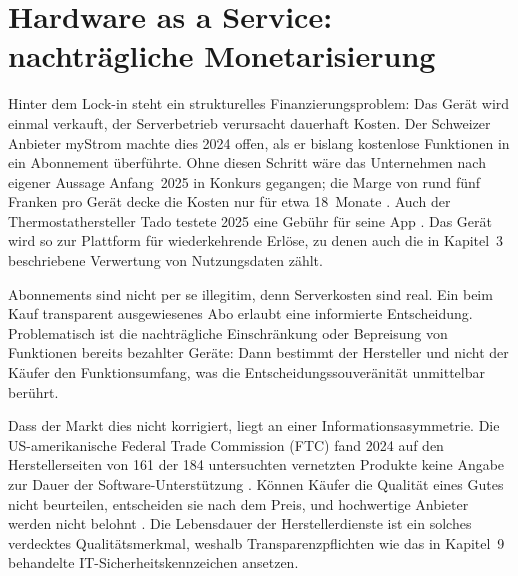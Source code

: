 \section{Hardware as a Service: nachträgliche Monetarisierung}\label{sec:cloud-haas}

Hinter dem Lock-in steht ein strukturelles Finanzierungsproblem: Das Gerät
wird einmal verkauft, der Serverbetrieb verursacht dauerhaft Kosten. Der
Schweizer Anbieter myStrom machte dies 2024 offen, als er bislang kostenlose
Funktionen in ein Abonnement überführte. Ohne diesen Schritt wäre das
Unternehmen nach eigener Aussage Anfang~2025 in Konkurs gegangen; die Marge
von rund fünf Franken pro Gerät decke die Kosten nur für etwa 18~Monate
\autocite[vgl.][]{itreseller:2024}. Auch der Thermostathersteller Tado
testete 2025 eine Gebühr für seine App \autocite[vgl.][]{heise:2025b}. Das
Gerät wird so zur Plattform für wiederkehrende Erlöse, zu denen auch die in
Kapitel~3 beschriebene Verwertung von Nutzungsdaten zählt.

Abonnements sind nicht per se illegitim, denn Serverkosten sind real. Ein
beim Kauf transparent ausgewiesenes Abo erlaubt eine informierte
Entscheidung. Problematisch ist die nachträgliche Einschränkung oder
Bepreisung von Funktionen bereits bezahlter Geräte: Dann bestimmt der
Hersteller und nicht der Käufer den Funktionsumfang, was die
Entscheidungssouveränität unmittelbar berührt.

Dass der Markt dies nicht korrigiert, liegt an einer Informationsasymmetrie.
Die US-amerikanische Federal Trade Commission (\acrshort{FTC}) fand 2024 auf
den Herstellerseiten von 161 der 184 untersuchten vernetzten Produkte keine
Angabe zur Dauer der Software-Unterstützung \autocite[vgl.][]{ftc:2024}.
Können Käufer die Qualität eines Gutes nicht beurteilen, entscheiden sie nach
dem Preis, und hochwertige Anbieter werden nicht belohnt
\autocite[vgl.][]{akerlof:1970}. Die Lebensdauer der Herstellerdienste ist ein
solches verdecktes Qualitätsmerkmal, weshalb Transparenzpflichten wie das in
Kapitel~9 behandelte IT-Sicherheitskennzeichen ansetzen.
